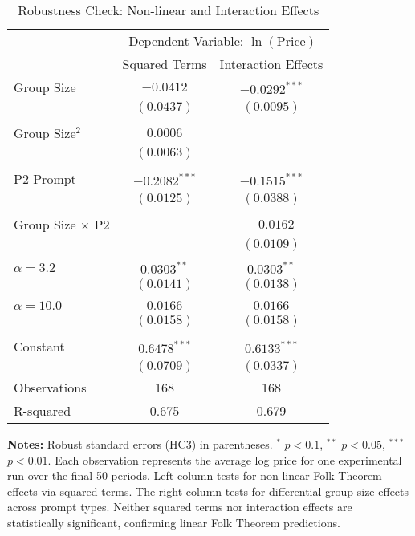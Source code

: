 \begin{table}[H]
    \centering
    \caption{Robustness Check: Non-linear and Interaction Effects}
    \label{tab:robustness_nonlinear}
    \begin{threeparttable}
    \begin{tabular}{lcc}
    \toprule
     & \multicolumn{2}{c}{Dependent Variable: $\ln(\text{Price})$} \\
    \cmidrule(lr){2-3}
     & Squared Terms & Interaction Effects \\
    \midrule
    Group Size & $-0.0412$ & $-0.0292^{***}$ \\
     & $(0.0437)$ & $(0.0095)$ \\
    \\
    Group Size$^2$ & $0.0006$ &  \\
     & $(0.0063)$ &  \\
    \\
    P2 Prompt & $-0.2082^{***}$ & $-0.1515^{***}$ \\
     & $(0.0125)$ & $(0.0388)$ \\
    \\
    Group Size $\times$ P2 &  & $-0.0162$ \\
     &  & $(0.0109)$ \\
    \\
    $\alpha = 3.2$ & $0.0303^{**}$ & $0.0303^{**}$ \\
     & $(0.0141)$ & $(0.0138)$ \\
    \\
    $\alpha = 10.0$ & $0.0166$ & $0.0166$ \\
     & $(0.0158)$ & $(0.0158)$ \\
    \\
    Constant & $0.6478^{***}$ & $0.6133^{***}$ \\
     & $(0.0709)$ & $(0.0337)$ \\
    \midrule
    Observations & 168 & 168 \\
    R-squared & 0.675 & 0.679 \\
    \bottomrule
    \end{tabular}
    \begin{tablenotes}[flushleft]
    \footnotesize
    \item \textbf{Notes:} Robust standard errors (HC3) in parentheses. $^{*}$ $p<0.1$, $^{**}$ $p<0.05$, $^{***}$ $p<0.01$. Each observation represents the average log price for one experimental run over the final 50 periods. Left column tests for non-linear Folk Theorem effects via squared terms. The right column tests for differential group size effects across prompt types. Neither squared terms nor interaction effects are statistically significant, confirming linear Folk Theorem predictions.
    \end{tablenotes}
    \end{threeparttable}
\end{table}

